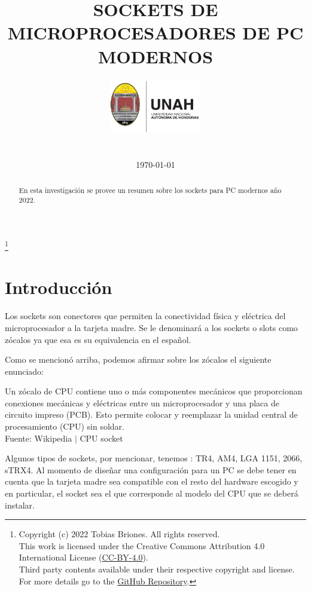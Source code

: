 \documentclass[conference]{IEEEtran}
\title{SOCKETS DE MICROPROCESADORES DE PC MODERNOS}
\author{
\includegraphics[width = 40mm]{images/logo-unah.png}\\[8ex]
\IEEEauthorblockN{Tobias Briones}
\IEEEauthorblockN{tobias.briones@unah.hn}
\IEEEauthorblockA{\textit{Universidad Nacional Autónoma de Honduras} \\
\textit{Ingeniería de Sistemas} \\
\textit{I PAC 2022} \\
\textit{IS911-MICROPROCESADORES}} \\\vspace*{20pt} \normalsize  \\
\today
}
\newcommand\blfootnote[1]{%
  \begingroup
  \renewcommand\thefootnote{}\footnote{#1}%
  \addtocounter{footnote}{-1}%
  \endgroup
}
\begin{document}
\maketitle

\begin{abstract}
En esta investigación se provee un resumen sobre los sockets para PC modernos año 2022.
\end{abstract}

\tableofcontents

\blfootnote{
Copyright (c) 2022 Tobias Briones. All rights reserved. \\
This work is licensed under the Creative Commons Attribution 4.0 International License (\href{https://spdx.org/licenses/CC-BY-4.0}{CC-BY-4.0}). \\
Third party contents available under their respective copyright and license.\\
For more details go to the \href{https://github.com/tobiasbriones/cp-unah-is911-microprocessors}{GitHub Repository}.}

\section{Introducción}

Los sockets son conectores que permiten la conectividad física y eléctrica del microprocesador a la tarjeta madre. Se le denominará a los sockets o slots como zócalos ya que esa es su equivalencia en el español.

\bigbreak

Como se mencionó arriba, podemos afirmar sobre los zócalos el siguiente enunciado:

\begin{displayquote}
    Un zócalo de CPU contiene uno o más componentes mecánicos que proporcionan conexiones mecánicas y eléctricas entre un microprocesador y una placa de circuito impreso (PCB). Esto permite colocar y reemplazar la unidad central de procesamiento (CPU) sin soldar.\\
    \small Fuente: Wikipedia $\mid$ CPU socket \cite{wikipedia-contributors-2022}
\end{displayquote}

\bigbreak

Algunos tipos de sockets, por mencionar, tenemos \cite{authortechnews-2020}: TR4, AM4, LGA 1151, 2066, sTRX4. Al momento de diseñar una configuración para un PC se debe tener en cuenta que la tarjeta madre sea compatible con el resto del hardware escogido y en particular, el socket sea el que corresponde al modelo del CPU que se deberá instalar.
\end{document}

